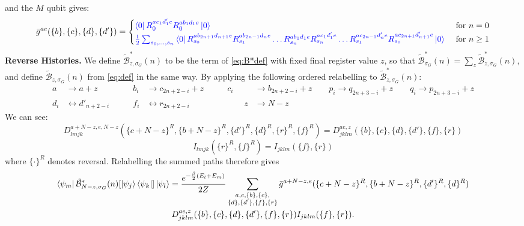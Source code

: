 \documentclass[aps,floatfix,10pt,amssymb,amsfont,amsmath,superscriptaddress,float,nofootinbib,longbibliography,nobalancelastpage,twocolumn]{revtex4-2}
\begin{document}
and the $M$ qubit gives:
\begin{equation}
       \bar g^{ae}(\{b\},\{c\},\{d\},\{d'\}) = \begin{cases} \textcolor{blue}{\bra{0}R_{0}^{ac_1d'_1e}R_{0}^{ab_1d_1e}\ket{0}}& \text{ for } n = 0\\
       \textcolor{blue}{\frac12\sum_{s_0,\ldots,s_n}
       \bra{0}R_{s_0}^{ab_{2n+1}d_{n+1}e}R_{s_1}^{ab_{2n-1}d_ne}\ldots
       R_{s_n}^{ab_{1}d_{1}e} R_{s_n}^{ac_{1}d'_{1}e}\ldots
       R_{s_1}^{ac_{2n-1}d'_ne}R_{s_0}^{ac_{2n+1}d'_{n+1}e}\ket{0}} & \text{ for } n \geq 1
       \end{cases}
       \label{eq:gbar-definition}
\end{equation}
\textbf{Reverse Histories.} We define $\tilde{\mathcal{B}}^*_{z,\sigma_G}(n)$ to be the term of \eqref{eq:B*def} with fixed final register value $z$, so that $\tilde{\mathcal{B}}^*_{\sigma_G}(n) = \sum_z \tilde{\mathcal{B}}^*_{z,\sigma_G}(n)$, and define $\tilde{\mathcal{B}}_{z,\sigma_G}(n)$ from \eqref{eq:def} in the same way. By applying the following ordered relabelling to $\tilde{\mathcal{B}}^*_{z,\sigma_G}(n)$:
\begin{align}
    a &\rightarrow a+ z &\qquad b_i &\rightarrow c_{2n+2-i} + z\qquad& c_i &\rightarrow b_{2n+2-i} + z  \qquad p_i \rightarrow q_{2n+3-i}+z \qquad q_i \rightarrow p_{2n+3-i} +z\\   d_i &\leftrightarrow d'_{n+2-i} &\qquad f_i &\leftrightarrow r_{2n+2-i} &\qquad z &\rightarrow N -z
\end{align}
We can see:
\begin{equation*}
   D^{a+N-z,e,N-z}_{lmjk}(\{c+N-z\}^R,\{b+N-z\}^R,\{d'\}^R,\{d\}^R,\{r\}^R,\{f\}^R) =  D^{ae,z}_{jklm}(\{b\},\{c\},\{d\},\{d'\},\{f\},\{r\})
\end{equation*}
\begin{equation*}
    I_{lmjk}(\{r\}^R,\{f\}^R) = I_{jklm}(\{f\},\{r\})
\end{equation*}
where $\{\cdot\}^R$ denotes reversal.
Relabelling the summed paths therefore gives
\begin{multline}
     \bra{\psi_m}\tilde{\mathcal{B}}^*_{N-z,\sigma_G}(n)[\ket{\psi_j}\bra{\psi_k}]\ket{\psi_l} = \frac{e^{-\frac{\beta}{2}(E_l+E_m)}}{2Z}\sum_{\substack{a,e,\{b\},\{c\},\\\{d\},\{d'\},\{f\},\{r\}}} \bar g^{a+N -z,e}(\{c+N -z\}^R,\{b+N -z\}^R,\{d'\}^R,\{d\}^R) 
     \\D^{ae,z}_{jklm}(\{b\},\{c\},\{d\},\{d'\},\{f\},\{r\})I_{jklm}(\{f\},\{r\}).
     \label{eq:relabelline}
\end{multline}
\end{document}
